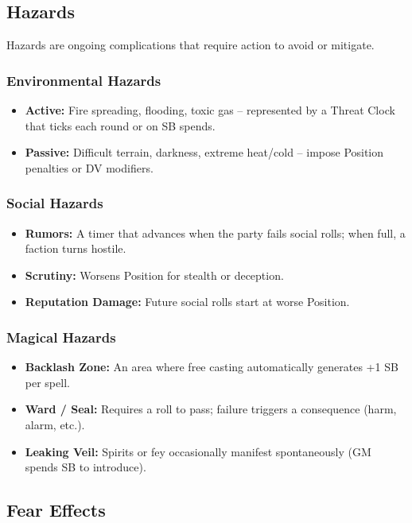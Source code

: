 \subsection{Hazards}

Hazards are ongoing complications that require action to avoid or mitigate.

\subsubsection{Environmental Hazards}
\begin{itemize}
  \item \textbf{Active:} Fire spreading, flooding, toxic gas – represented by a Threat Clock that ticks each round or on SB spends.
  \item \textbf{Passive:} Difficult terrain, darkness, extreme heat/cold – impose Position penalties or DV modifiers.
\end{itemize}

\subsubsection{Social Hazards}
\begin{itemize}
  \item \textbf{Rumors:} A timer that advances when the party fails social rolls; when full, a faction turns hostile.
  \item \textbf{Scrutiny:} Worsens Position for stealth or deception.
  \item \textbf{Reputation Damage:} Future social rolls start at worse Position.
\end{itemize}

\subsubsection{Magical Hazards}
\begin{itemize}
  \item \textbf{Backlash Zone:} An area where free casting automatically generates +1 SB per spell.
  \item \textbf{Ward / Seal:} Requires a roll to pass; failure triggers a consequence (harm, alarm, etc.).
  \item \textbf{Leaking Veil:} Spirits or fey occasionally manifest spontaneously (GM spends SB to introduce).
\end{itemize}

\subsection{Fear Effects}

